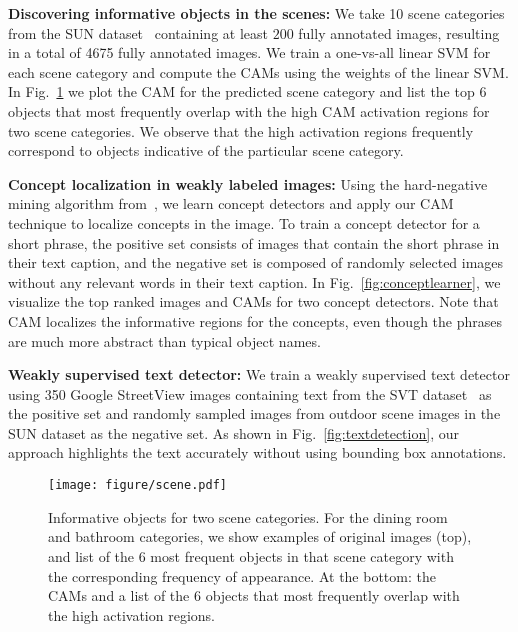 \documentclass[10pt,twocolumn,letterpaper]{article}
\begin{document}
\textbf{Discovering informative objects in the scenes:} We take 10 scene categories from the SUN dataset~\cite{xiao2010sun} containing at least $200$ fully annotated images, resulting in a total of 4675 fully annotated images. We train a one-vs-all linear SVM for each scene category and compute the CAMs using the weights of the linear SVM. In Fig.~\ref{fig:scene} we plot the CAM for the predicted scene category and list the top 6 objects that most frequently overlap with the high CAM activation regions for two scene categories. We observe that the high activation regions frequently correspond to objects indicative of the particular scene category.


\textbf{Concept localization in weakly labeled images:} Using the hard-negative mining algorithm from~\cite{zhou2014conceptlearner}, we learn concept detectors and apply our CAM technique to localize  concepts in the image. To train a concept detector for a short phrase, the positive set consists of  images that contain the short phrase in their text caption, and the negative set is composed of randomly selected images without any relevant words in their text caption. In Fig.~\ref{fig:conceptlearner}, we visualize the top ranked images and CAMs for two concept detectors. Note that CAM localizes the informative regions for the concepts, even though the phrases are much more abstract than typical object names.

\textbf{Weakly supervised text detector:} We train a weakly supervised text detector using 350 Google StreetView images containing text from the SVT dataset~\cite{wang2011end} as the positive set and randomly sampled images from outdoor scene images in the SUN dataset \cite{xiao2010sun} as the negative set. As shown in Fig.~\ref{fig:textdetection}, our approach highlights the text accurately without using bounding box annotations.

\begin{figure}
\begin{center}
\texttt{[image: figure/scene.pdf]}
\end{center}
\vspace*{-4mm}
\caption{Informative objects for two scene categories. For the dining room and bathroom categories, we show examples of original images (top), and list of the $6$ most frequent objects in that scene category with the corresponding frequency of appearance. At the bottom: the CAMs and a list of the 6 objects that most frequently overlap with the high activation regions.}
\label{fig:scene}
\end{figure}
\end{document}
